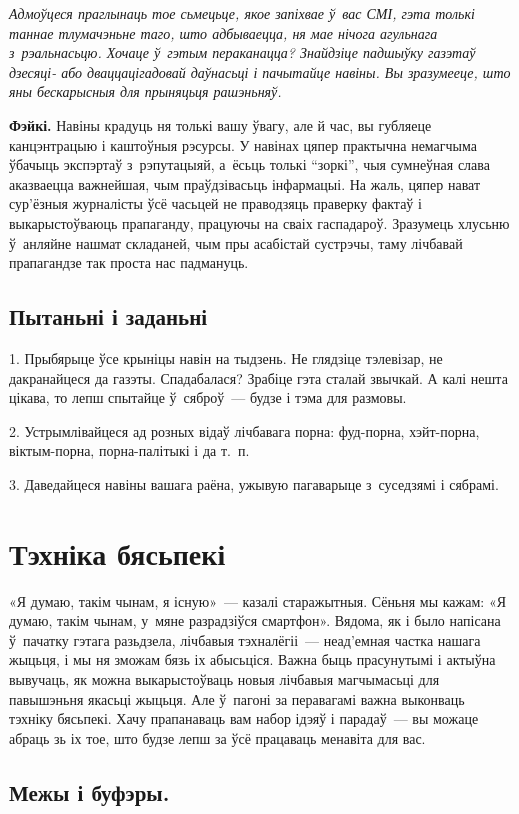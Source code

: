 \emph{Адмоўцеся праглынаць тое сьмецьце, якое запіхвае ў~вас СМІ, гэта толькі таннае тлумачэньне таго, што адбываецца, ня мае нічога агульнага з~рэальнасьцю. Хочаце ў~гэтым пераканацца? Знайдзіце падшыўку газэтаў дзесяці- або дваццацігадовай даўнасьці і пачытайце навіны. Вы зразумееце, што яны бескарысныя для прыняцьця рашэньняў.}

\textbf{Фэйкі.} Навіны крадуць ня толькі вашу ўвагу, але й час, вы губляеце канцэнтрацыю і каштоўныя рэсурсы. У навінах цяпер практычна немагчыма ўбачыць экспэртаў з~рэпутацыяй, а~ёсьць толькі ``зоркі'', чыя сумнеўная слава аказваецца важнейшая, чым праўдзівасьць інфармацыі. На жаль, цяпер нават сур'ёзныя журналісты ўсё часьцей не праводзяць праверку фактаў і выкарыстоўваюць прапаганду, працуючы на сваіх гаспадароў. Зразумець хлусьню ў~анляйне нашмат складаней, чым пры асабістай сустрэчы, таму лічбавай прапагандзе так проста нас падмануць.

\subsection*{Пытаньні і заданьні}

1. Прыбярыце ўсе крыніцы навін на тыдзень. Не глядзіце тэлевізар, не дакранайцеся да газэты. Спадабалася? Зрабіце гэта сталай звычкай. А калі нешта цікава, то лепш спытайце ў~сяброў~--- будзе і тэма для размовы.

2. Устрымлівайцеся ад розных відаў лічбавага порна: фуд-порна, хэйт-порна, віктым-порна, порна-палітыкі і да т.~п.

3. Даведайцеся навіны вашага раёна, ужывую пагаварыце з~суседзямі і сябрамі.


\section{Тэхніка бясьпекі}

«Я думаю, такім чынам, я існую»~--- казалі старажытныя. Сёньня мы кажам: «Я думаю, такім чынам, у~мяне разрадзіўся смартфон». Вядома, як і было напісана ў~пачатку гэтага разьдзела, лічбавыя тэхналёгіі~--- неад'емная частка нашага жыцьця, і мы ня зможам бязь іх абысьціся. Важна быць прасунутымі і актыўна вывучаць, як можна выкарыстоўваць новыя лічбавыя магчымасьці для павышэньня якасьці жыцьця. Але ў~пагоні за перавагамі важна выконваць тэхніку бясьпекі. Хачу прапанаваць вам набор ідэяў і парадаў~--- вы можаце абраць зь іх тое, што будзе лепш за ўсё працаваць менавіта для вас.

\subsection*{Межы і буфэры.}

